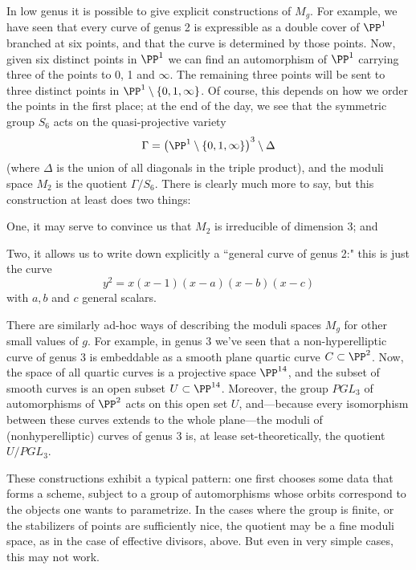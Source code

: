 In low genus it is possible to give explicit constructions of $M_g$. For example, we have seen that every curve of genus 2 is expressible as a double cover of $\PP^1$ branched at six points, and  that the curve is determined by those points. Now, given six distinct points in $\PP^1$ we can find an automorphism of $\PP^1$ carrying three of the points to 0, 1 and $\infty$. The remaining three points will be sent to three distinct points in $\PP^1 \setminus \{0, 1, \infty \} $. Of course, this depends on how we order the points in the first place; at the end of the day, we see that the symmetric group $S_6$ acts on the quasi-projective variety
$$
\Gamma = \left( \PP^1 \setminus \{0, 1, \infty \} \right)^3 \setminus \Delta
$$
(where $\Delta$ is the union of all diagonals in the triple product), and the moduli space $M_2$ is the quotient $\Gamma/S_6$. There is clearly much more to say, but this construction at least does two things:

One, it may serve to convince us that $M_2$ is irreducible of dimension 3; and

Two, it allows us to write down explicitly a ``general curve of genus 2:" this is just the curve
$$
y^2 = x(x-1)(x-a)(x-b)(x-c)
$$
with $a, b$ and $c$ general scalars.

There are similarly ad-hoc ways of describing the moduli spaces $M_g$ for other small values of $g$. For example, in genus 3 we've seen that a non-hyperelliptic curve of genus 3 is embeddable as a smooth plane quartic curve $C \subset \PP^2$. Now, the space of all quartic curves is a projective space $\PP^{14}$, and the subset of smooth curves is an open subset $U \subset \PP^{14}$. Moreover, the group $PGL_3$ of automorphisms of $\PP^2$ acts on this open set $U$, and---because every isomorphism between these curves extends to the whole plane---the moduli of (nonhyperelliptic) curves of genus 3 is, at lease set-theoretically, the quotient $U/PGL_3$.

These constructions exhibit a typical pattern: one first chooses some data that forms a scheme, subject to a group of automorphisms whose orbits correspond to the objects one wants to parametrize. In the cases where the group is finite, or the stabilizers of points are sufficiently nice, the quotient may be a fine moduli space, as in the case of effective divisors, above. But even in very simple cases, this may not work.

